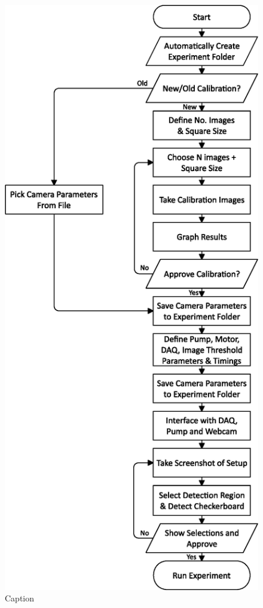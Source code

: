 \documentclass{physics_article_B}
\begin{document}
        \newpage
        \begin{figure}[H]
            \centering
            \hspace*{-5.4cm}\includegraphics[scale=0.8]{Figures/FlowSetup.eps}
            \caption{Caption}
            \label{fig:setup:flow}
        \end{figure}
        
\end{document}
